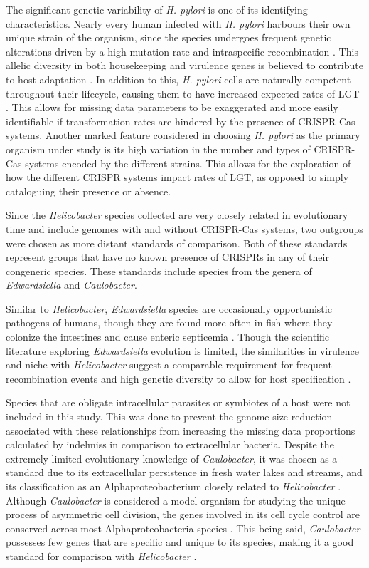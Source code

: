 \documentclass[english]{article}
\begin{document}
The significant genetic variability of \textit{H. pylori} is one of its
identifying characteristics. Nearly every human infected with \textit{H.
pylori} harbours their own unique strain of the organism, since the
species undergoes frequent genetic alterations driven by a high mutation rate and
intraspecific recombination \citep{Suer:07}. This allelic diversity in both
housekeeping and virulence genes is believed to contribute to host
adaptation \citep{Suer:07}.  In addition to this, \textit{H. pylori} cells are naturally
competent throughout their lifecycle, causing them to have increased
expected rates of LGT \citep{Raga:09}. This allows for missing data parameters to be
exaggerated and more easily identifiable if transformation rates are
hindered by the presence of CRISPR-Cas systems. Another marked feature
considered in choosing \textit{H. pylori} as the primary organism under study
is its high variation in the number and types of CRISPR-Cas systems
encoded by the different strains. This allows for the exploration of
how the different CRISPR systems impact rates of LGT, as opposed to
simply cataloguing their presence or absence. 

Since the \textit{Helicobacter} species collected are very closely related in
evolutionary time and include genomes with and without CRISPR-Cas
systems, two outgroups were chosen as more distant standards of
comparison. Both of these standards represent groups that have no
known presence of CRISPRs in any of their congeneric species. These
standards include species from the genera of \textit{Edwardsiella} and
\textit{Caulobacter}. 

Similar to \textit{Helicobacter}, \textit{Edwardsiella} species are occasionally
opportunistic pathogens of humans, though they are found more often in
fish where they colonize the intestines and cause enteric septicemia
\citep{Yang:12}.
Though the scientific literature exploring \textit{Edwardsiella} evolution is
limited, the similarities in virulence and niche with
\textit{Helicobacter} suggest a comparable requirement for frequent
recombination events and high genetic diversity to allow for host
specification \citep{Yang:12}.  

Species that are obligate intracellular parasites or symbiotes of a
host were not included in this study. This was done to prevent the
genome size reduction associated with these relationships from increasing the
missing data proportions calculated by indelmiss in comparison to
extracellular bacteria. Despite the extremely limited evolutionary
knowledge of \textit{Caulobacter}, it was chosen as a standard due to its
extracellular persistence in fresh water lakes and streams, and its
classification as an Alphaproteobacterium closely related to
\textit{Helicobacter} \citep{Neil:85}. 
Although \textit{Caulobacter} is considered a model organism for studying the unique process of asymmetric cell division, the genes
involved in its cell cycle control are conserved across most
Alphaproteobacteria species \citep{Neil:85}. This being said, \textit{Caulobacter} possesses
few genes that are specific and unique to its species, making it a
good standard for comparison with \textit{Helicobacter}
\citep{Neil:85}. 
\end{document}
